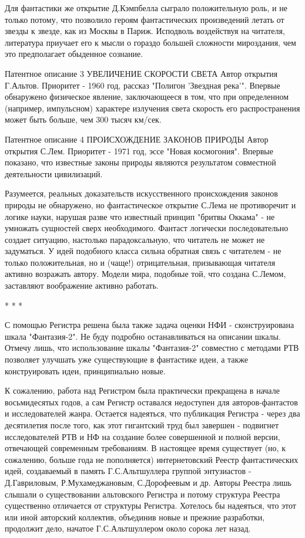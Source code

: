 \documentclass[11pt,a4paper]{article}
\begin{document}
Для фантастики же открытие Д.Кэмпбелла сыграло положительную роль, и не только потому, что позволило героям фантастических произведений летать от звезды к звезде, как из Москвы в Париж. Исподволь воздействуя на читателя, литература приучает его к мысли о гораздо большей сложности мироздания, чем это предполагает обыденное сознание.

Патентное описание 3
УВЕЛИЧЕНИЕ СКОРОСТИ СВЕТА
Автор открытия Г.Альтов. Приоритет - 1960 год, рассказ "Полигон ’Звездная река’".
Впервые обнаружено физическое явление, заключающееся в том, что при определенном (например, импульсном) характере излучения света скорость его распространения может быть больше, чем 300 тысяч км/сек.

Патентное описание 4
ПРОИСХОЖДЕНИЕ ЗАКОНОВ ПРИРОДЫ
Автор открытия С.Лем. Приоритет - 1971 год, эссе "Новая космогония".
Впервые показано, что известные законы природы являются результатом совместной деятельности цивилизаций.

Разумеется, реальных доказательств искусственного происхождения законов природы не обнаружено, но фантастическое открытие С.Лема не противоречит и логике науки, нарушая разве что известный принцип "бритвы Оккама" - не умножать сущностей сверх необходимого. Фантаст логически последовательно создает ситуацию, настолько парадоксальную, что читатель не может не задуматься. У идей подобного класса сильна обратная связь с читателем - не только положительная, но и (чаще!) отрицательная, призывающая читателя активно возражать автору. Модели мира, подобные той, что создана С.Лемом, заставляют воображение активно работать.

* * *

С помощью Регистра решена была также задача оценки НФИ - сконструирована шкала "Фантазия-2". Не буду подробно останавливаться на описании шкалы. Отмечу лишь, что использование шкалы "Фантазия-2" совместно с методами РТВ позволяет улучшать уже существующие в фантастике идеи, а также конструировать идеи, принципиально новые.

К сожалению, работа над Регистром была практически прекращена в начале
восьмидесятых годов, а сам Регистр оставался недоступен для авторов-фантастов
и исследователей жанра. Остается надеяться, что публикация Регистра - через
два десятилетия после того, как этот гигантский труд был завершен - подвигнет
исследователей РТВ и НФ на создание более совершенной и полной версии,
отвечающей современным требованиям. В настоящее время существует (но, к
сожалению, больше года не пополняется) интернетовский Реестр фантастических
идей, создаваемый в память Г.С.Альтшуллера группой энтузиастов - Д.Гавриловым,
Р.Мухамеджановым, С.Дорофеевым и др. Авторы Реестра лишь слышали о
существовании альтовского Регистра и потому структура Реестра существенно
отличается от структуры Регистра. Хотелось бы надеяться, что этот или иной
авторский коллектив, объединив новые и прежние разработки, продолжит дело,
начатое Г.С.Альтшуллером около сорока лет назад.
\end{document}
